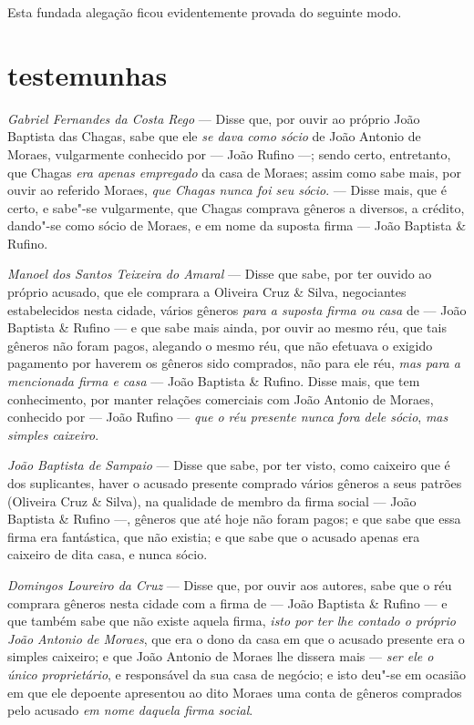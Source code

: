 Esta fundada alegação ficou evidentemente provada do seguinte modo.

\section*{testemunhas}

\noindent\emph{Gabriel Fernandes da Costa Rego} --- Disse que, por ouvir ao
próprio João Baptista das Chagas, sabe que ele \emph{se dava como sócio}
de João Antonio de Moraes, vulgarmente conhecido por --- João Rufino ---;
sendo certo, entretanto, que Chagas \emph{era apenas empregado} da casa
de Moraes; assim como sabe mais, por ouvir ao referido Moraes, \emph{que
Chagas nunca foi seu sócio}. --- Disse mais, que é certo, e sabe"-se
vulgarmente, que Chagas comprava gêneros a diversos, a crédito, dando"-se
como sócio de Moraes, e em nome da suposta firma --- João Baptista \&
Rufino.\medskip

\noindent\emph{Manoel dos Santos Teixeira do Amaral} --- Disse que sabe, por ter
ouvido ao próprio acusado, que ele comprara a Oliveira Cruz \& Silva,
negociantes estabelecidos nesta cidade, vários gêneros \emph{para a
suposta firma ou casa} de --- João Baptista \& Rufino --- e que sabe
mais ainda, por ouvir ao mesmo réu, que tais gêneros não foram pagos,
alegando o mesmo réu, que não efetuava o exigido pagamento por haverem
os gêneros sido comprados, não para ele réu, \emph{mas para a mencionada
firma e casa} --- João Baptista \& Rufino. Disse mais, que tem
conhecimento, por manter relações comerciais com João Antonio de Moraes,
conhecido por --- João Rufino --- \emph{que o réu presente nunca fora
dele sócio}, \emph{mas simples caixeiro}.\medskip

\noindent\emph{João Baptista de Sampaio} --- Disse que sabe, por ter visto, como
caixeiro que é dos suplicantes, haver o acusado presente comprado vários
gêneros a seus patrões (Oliveira Cruz \& Silva), na qualidade de membro
da firma social --- João Baptista \& Rufino ---, gêneros que até hoje
não foram pagos; e que sabe que essa firma era fantástica, que não
existia; e que sabe que o acusado apenas era caixeiro de dita casa, e
nunca sócio.\medskip

\noindent\emph{Domingos Loureiro da Cruz} --- Disse que, por ouvir aos autores,
sabe que o réu comprara gêneros nesta cidade com a firma de --- João
Baptista \& Rufino --- e que também sabe que não existe aquela firma,
\emph{isto por ter lhe contado o próprio João Antonio de Moraes}, que
era o dono da casa em que o acusado presente era o simples caixeiro; e
que João Antonio de Moraes lhe dissera mais --- \emph{ser ele o único
proprietário}, e responsável da sua casa de negócio; e isto deu"-se em
ocasião em que ele depoente apresentou ao dito Moraes uma conta de
gêneros comprados pelo acusado \emph{em nome daquela firma social}.

